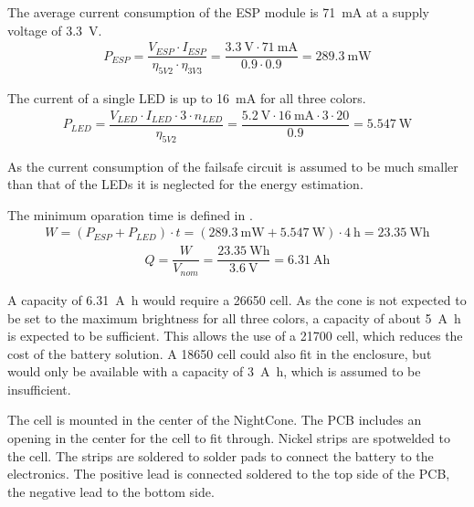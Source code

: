 The average current consumption of the ESP module is \qty{71}{\milli\ampere} at a supply voltage of \qty{3.3}{\volt}. \cite{AIThinker:ESP_12F}
\begin{align}
    P_{ESP} = \dfrac{V_{ESP} \cdot I_{ESP}}{\eta_{5V2} \cdot \eta_{3V3}} = \dfrac{\qty{3.3}{\volt} \cdot \qty{71}{\milli\ampere}}{0.9 \cdot 0.9} = \qty{289.3}{\milli\watt}
\end{align}

The current of a single \ac{LED} is up to \qty{16}{\milli\ampere} for all three colors. \cite{Worldsemi:WS2813E}
\begin{align}
    P_{LED} = \dfrac{V_{LED} \cdot I_{LED} \cdot 3 \cdot n_{LED}}{\eta_{5V2}} = \dfrac{\qty{5.2}{\volt} \cdot \qty{16}{\milli\ampere} \cdot 3 \cdot 20}{0.9} = \qty{5.547}{\watt}
\end{align}

As the current consumption of the failsafe circuit is assumed to be much smaller than that of the \acp{LED} it is neglected for the energy estimation. 

The minimum oparation time is defined in . 
\begin{align}
    W = \left(P_{ESP} + P_{LED}\right) \cdot t = \left(\qty{289.3}{\milli\watt} + \qty{5.547}{\watt}\right) \cdot \qty{4}{\hour} = \qty{23.35}{\watt\hour}
\end{align}
\begin{align}
    Q = \dfrac{W}{V_{nom}} = \dfrac{\qty{23.35}{\watt\hour}}{\qty{3.6}{\volt}} = \qty{6.31}{\ampere\hour}
\end{align}

A capacity of \qty{6.31}{\ampere\hour} would require a 26650 cell. As the cone is not expected to be set to the maximum brightness for all three colors, a capacity of about \qty{5}{\ampere\hour} is expected to be sufficient. This allows the use of a 21700 cell, which reduces the cost of the battery solution. A 18650 cell could also fit in the enclosure, but would only be available with a capacity of \qty{3}{\ampere\hour}, which is assumed to be insufficient. 

The cell is mounted in the center of the NightCone. The \ac{PCB} includes an opening in the center for the cell to fit through. Nickel strips are spotwelded to the cell. The strips are soldered to solder pads to connect the battery to the electronics. The positive lead is connected soldered to the top side of the \ac{PCB}, the negative lead to the bottom side. 

